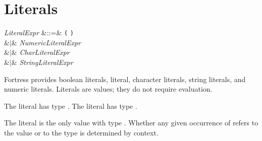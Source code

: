 %
%
%
%

\section{Literals}


\begin{Grammar}
\emph{LiteralExpr} &::=& \texttt{(} \texttt{)}\\
&$|$& \emph{NumericLiteralExpr}\\
&$|$& \emph{CharLiteralExpr}\\
&$|$& \emph{StringLiteralExpr}\\
\end{Grammar}

Fortress provides boolean literals, \TYP{()} literal, character literals,
string literals, and numeric literals.  Literals are values; they do not
require evaluation.


The literal  has type
.
The literal  has type
.

The literal \EXP{()} is the only value with type \TYP{()}.
Whether any given occurrence of \TYP{()} refers to the value \EXP{()} or
to the type \TYP{()} is determined by context.

